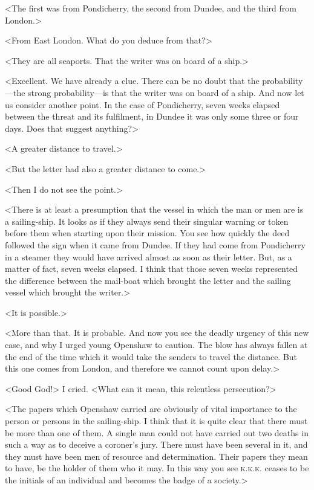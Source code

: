 <The first was from Pondicherry, the second from Dundee, and the third from London.>

<From East London. What do you deduce from that?>

<They are all seaports. That the writer was on board of a ship.>

<Excellent. We have already a clue. There can be no doubt that the probability—the strong probability—is that the writer was on board of a ship. And now let us consider another point. In the case of Pondicherry, seven weeks elapsed between the threat and its fulfilment, in Dundee it was only some three or four days. Does that suggest anything?>

<A greater distance to travel.>

<But the letter had also a greater distance to come.>

<Then I do not see the point.>

<There is at least a presumption that the vessel in which the man or men are is a sailing-ship. It looks as if they always send their singular warning or token before them when starting upon their mission. You see how quickly the deed followed the sign when it came from Dundee. If they had come from Pondicherry in a steamer they would have arrived almost as soon as their letter. But, as a matter of fact, seven weeks elapsed. I think that those seven weeks represented the difference between the mail-boat which brought the letter and the sailing vessel which brought the writer.>

<It is possible.>

<More than that. It is probable. And now you see the deadly urgency of this new case, and why I urged young Openshaw to caution. The blow has always fallen at the end of the time which it would take the senders to travel the distance. But this one comes from London, and therefore we cannot count upon delay.>

<Good God!> I cried. <What can it mean, this relentless persecution?>

<The papers which Openshaw carried are obviously of vital importance to the person or persons in the sailing-ship. I think that it is quite clear that there must be more than one of them. A single man could not have carried out two deaths in such a way as to deceive a coroner's jury. There must have been several in it, and they must have been men of resource and determination. Their papers they mean to have, be the holder of them who it may. In this way you see \textsc{k.k.k.} ceases to be the initials of an individual and becomes the badge of a society.>

